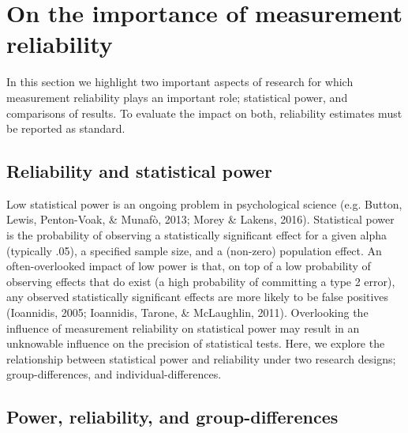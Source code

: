 \documentclass[english,,man,floatsintext]{apa6}
\begin{document}
\hypertarget{on-the-importance-of-measurement-reliability}{%
\section{On the importance of measurement reliability}\label{on-the-importance-of-measurement-reliability}}

In this section we highlight two important aspects of research for which measurement reliability plays an important role; statistical power, and comparisons of results. To evaluate the impact on both, reliability estimates must be reported as standard.

\hypertarget{reliability-and-statistical-power}{%
\subsection{Reliability and statistical power}\label{reliability-and-statistical-power}}

Low statistical power is an ongoing problem in psychological science (e.g. Button, Lewis, Penton-Voak, \& Munafò, 2013; Morey \& Lakens, 2016). Statistical power is the probability of observing a statistically significant effect for a given alpha (typically .05), a specified sample size, and a (non-zero) population effect. An often-overlooked impact of low power is that, on top of a low probability of observing effects that do exist (a high probability of committing a type 2 error), any observed statistically significant effects are more likely to be false positives (Ioannidis, 2005; Ioannidis, Tarone, \& McLaughlin, 2011). Overlooking the influence of measurement reliability on statistical power may result in an unknowable influence on the precision of statistical tests. Here, we explore the relationship between statistical power and reliability under two research designs; group-differences, and individual-differences.

\hypertarget{power-reliability-and-group-differences}{%
\subsection{Power, reliability, and group-differences}\label{power-reliability-and-group-differences}}
\end{document}
